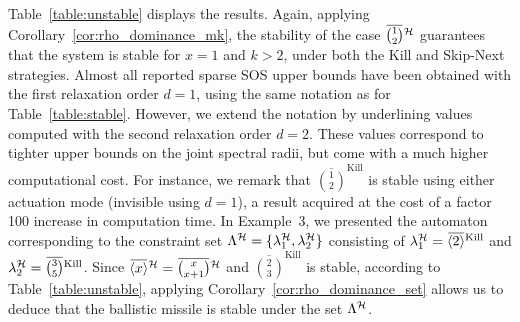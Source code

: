 Table~\ref{table:unstable} displays the results.
Again, applying Corollary~\ref{cor:rho_dominance_mk}, the stability of the case $\overbar{\binom{1}{2}}^{\strat}$ guarantees that the system is stable for $x=1$ and $k>2$, under both the Kill and Skip-Next strategies.
Almost all reported sparse SOS upper bounds have been obtained with the first relaxation order $d=1$, using the same notation as for Table~\ref{table:stable}.
However, we extend the notation by underlining values computed with the second relaxation order $d=2$.
These values correspond to tighter upper bounds on the joint spectral radii, but come with a much higher computational cost.
For instance, we remark that $\overbar{\binom{1}{2}}^{\text{Kill}}$ is stable using either actuation mode (invisible using $d=1$), a result acquired at the cost of a factor 100 increase in computation time.
%
In Example~$3$, we presented the automaton corresponding to the constraint set $\Lambda^{\mathcal{H}} = \{ \lambda^{\mathcal{H}}_1, \lambda^{\mathcal{H}}_2 \}$ consisting of $\lambda^{\strat}_1 = \overbar{\left<2\right>}^{\text{Kill}}$ and $\lambda^{\strat}_2 = \overbar{\binom{3}{5}}^{\text{Kill}}$.
Since $\overbar{\left<x\right>}^{\strat} = \overbar{\binom{x}{x+1}}^{\strat}$ and $\overbar{\binom{2}{3}}^{\text{Kill}}$ is stable, according to Table~\ref{table:unstable}, applying Corollary~\ref{cor:rho_dominance_set} allows us to deduce that the ballistic missile is stable under the \ewhc{} set $\Lambda^{\mathcal{H}}$.
